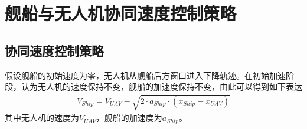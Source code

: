 %
%

\section{舰船与无人机协同速度控制策略}
\subsection{协同速度控制策略}
假设舰船的初始速度为零，无人机从舰船后方窗口进入下降轨迹。在初始加速阶段，认为无人机的速度保持不变，舰船的加速度保持不变，由此可以得到如下表达
\begin{align}
V_{Ship} = V_{UAV} - \sqrt{2 \cdot a_{Ship} \cdot (x_{Ship} - x_{UAV})}
\end{align}
其中无人机的速度为$V_{UAV}$，舰船的加速度为$a_{Ship}$。

